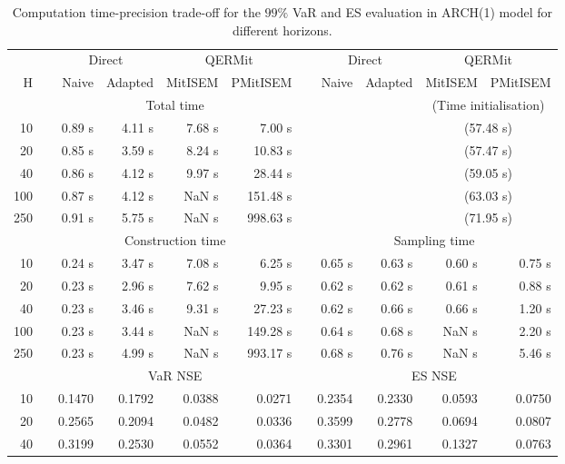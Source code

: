 \footnotesize{  
{ \renewcommand{\arraystretch}{1.3} 
\begin{longtable}{rr rrrr r rrrr}  
\caption{Computation time-precision trade-off for the  $99\%$ VaR and ES evaluation in ARCH(1) model for different horizons.} 
\label{tab:time_precision_arch} \\ 
 & & \multicolumn{2}{c}{Direct} & \multicolumn{2}{c}{QERMit}&  & \multicolumn{2}{c}{Direct} & \multicolumn{2}{c}{QERMit} \\ \cline{3-6} \cline{8-11} 
 H & & Naive & Adapted & MitISEM & PMitISEM & & Naive & Adapted & MitISEM & PMitISEM \\ \hline 
 & & \multicolumn{4}{c}{Total time} & & && \multicolumn{2}{c}{(Time initialisation)} \\ \cline{3-6} \cline{10-11}
10 & & 0.89 s & 4.11 s & 7.68 s & 7.00 s &&&& \multicolumn{2}{c}{(57.48 s)} \\ 
20 & & 0.85 s & 3.59 s & 8.24 s & 10.83 s &&&& \multicolumn{2}{c}{(57.47 s)} \\ 
40 & & 0.86 s & 4.12 s & 9.97 s & 28.44 s &&&& \multicolumn{2}{c}{(59.05 s)} \\ 
100 & & 0.87 s & 4.12 s &  NaN s & 151.48 s &&&& \multicolumn{2}{c}{(63.03 s)} \\ 
250 & & 0.91 s & 5.75 s &  NaN s & 998.63 s &&&& \multicolumn{2}{c}{(71.95 s)} \\ 
\hline 
 & & \multicolumn{4}{c}{Construction time} & & \multicolumn{4}{c}{ Sampling time} \\ \cline{3-6}  \cline{8-11}
10 & & 0.24 s & 3.47 s & 7.08 s & 6.25 s && 0.65 s & 0.63 s & 0.60 s & 0.75 s \\ 
20 & & 0.23 s & 2.96 s & 7.62 s & 9.95 s && 0.62 s & 0.62 s & 0.61 s & 0.88 s \\ 
40 & & 0.23 s & 3.46 s & 9.31 s & 27.23 s && 0.62 s & 0.66 s & 0.66 s & 1.20 s \\ 
100 & & 0.23 s & 3.44 s &  NaN s & 149.28 s && 0.64 s & 0.68 s &  NaN s & 2.20 s \\ 
250 & & 0.23 s & 4.99 s &  NaN s & 993.17 s && 0.68 s & 0.76 s &  NaN s & 5.46 s \\ 
\hline 
 & & \multicolumn{4}{c}{VaR NSE} &&  \multicolumn{4}{c}{ES NSE} \\ \cline{3-6}  \cline{8-11}
10 && 0.1470  & 0.1792  & 0.0388 & 0.0271 && 0.2354  & 0.2330  & 0.0593 & 0.0750 \\ 
20 && 0.2565  & 0.2094  & 0.0482 & 0.0336 && 0.3599  & 0.2778  & 0.0694 & 0.0807 \\ 
40 && 0.3199  & 0.2530  & 0.0552 & 0.0364 && 0.3301  & 0.2961  & 0.1327 & 0.0763 \\ 

\end{longtable}}}
